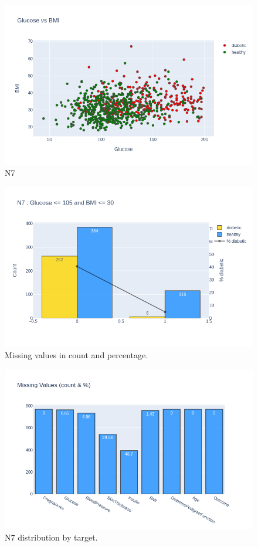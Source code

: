 \documentclass[12pt]{article}
\begin{document}
\begin{figure}[ht]
\centering
\includegraphics[width=1\textwidth]{newplot(28).png}
\caption{N7}
\end{figure}

\begin{figure}[ht]
\centering
\includegraphics[width=1\textwidth]{newplot(29).png}
\caption{Missing values in count and percentage.}
\end{figure}

\begin{figure}[ht]
\centering
\includegraphics[width=1\textwidth]{newplot(2).png}
\caption{N7 distribution by target.}
\end{figure}
\end{document}
